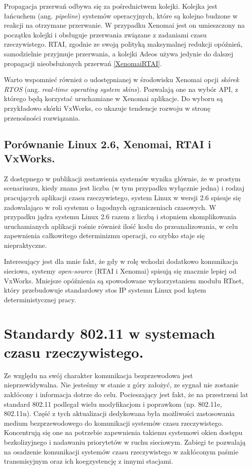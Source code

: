 Propagacja przerwań odbywa się za pośrednictwem kolejki. Kolejka jest łańcuchem (ang. \emph{pipeline}) systemów operacyjnych, które są kolejno budzone w reakcji na otrzymane przerwanie. W przypadku Xenomai jest on umieszczony na początku kolejki i obsługuje przerwania związane z zadaniami czasu rzeczywistego. RTAI, zgodnie ze swoją polityką maksymalnej redukcji opóźnień, samodzielnie przyjmuje przerwania, a kolejki Adeos używa jedynie do dalszej propagacji nieobsłużonych przerwań \ref{XenomaiRTAI}. 

Warto wspomnieć również o udostępnianej w środowisku Xenomai opcji \emph{skórek RTOS} (ang. \emph{real-time operating system skins}). Pozwalają one na wybór API, z którego będą korzystać uruchamiane w Xenomai aplikacje. Do wyboru są przykładowo skórki VxWorks, co ukazuje tendencje rozwoju w stronę przenośności rozwiązania.

\subsection{Porównanie Linux 2.6, Xenomai, RTAI i VxWorks.}

Z dostępnego w publikacji \cite{pub:Comparison} zestawienia systemów wynika głównie, że w prostym scenariuszu, kiedy znana jest liczba (w tym przypadku wyłącznie jedna) i rodzaj pracujących aplikacji czasu rzeczywistego, system Linux w wersji 2.6 spisuje się zadowalająco w roli systemu o łagodnych ograniczeniach czasowych. W przypadku jądra systemu Linux 2.6 razem z liczbą i stopniem skomplikowania uruchamianych aplikacji rośnie również ilość kodu do przeanalizowania, w celu zapewnienia całkowitego determinizmu operacji, co szybko staje się niepraktyczne.

Interesujący jest dla mnie fakt, że gdy w rolę wchodzi dodatkowo komunikacja sieciowa, systemy \emph{open-source} (RTAI i Xenomai) spisują się znacznie lepiej od VxWorks. Mniejsze opóźnienia są spowodowane wykorzystaniem modułu RTnet, który przebudowuje standardowy stos IP systemu Linux pod kątem deterministycznej pracy.


\section{Standardy 802.11 w systemach czasu rzeczywistego.}

Ze względu na swój charakter komunikacja bezprzewodowa jest nieprzewidywalna. Nie jesteśmy w stanie z góry założyć, ze sygnał nie zostanie zakłócony i informacja dotrze do celu. Pocieszający jest fakt, że na przestrzeni lat standard 802.11 podlegał wielu modyfikacjom i poprawkom (np. 802.11e, 802.11n). Część z tych aktualizacji dedykowana była możliwości zastosowania medium bezprzewodowego do komunikacji systemów czasu rzeczywistego. Koncentrują się one na potrzebie zapewnienia takiemu systemowi okien dostępu bezkolizyjnego i nadawaniu priorytetów w ruchu sieciowym. Zabiegi te pozwalają na osadzenie komunikacji systemów czasu rzeczywistego w zakłóconym paśmie transmisyjnym oraz ich koegzystencję z innymi stacjami. 

